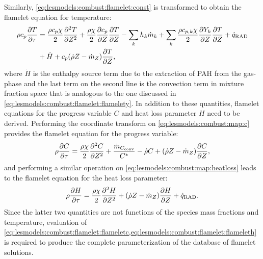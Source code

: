 Similarly, \cref{eq:lesmodels:combust:flamelet:const} is transformed to obtain the flamelet equation for temperature:
\begin{equation}\label{eq:lesmodels:combust:flamelet:flamelett}
  \begin{split}
    \rho c_p \pder[T]{\tau} &= \frac{\rho c_p \chi}{2}\sder[T]{Z} + \frac{\rho\chi}{2}\pder[c_p]{Z}\pder[T]{Z} - \sum\limits_{k} h_k\dot{m}_k + \sum\limits_{k} \frac{\rho c_{p,k}\chi}{2}\pder[Y_k]{Z}\pder[T]{Z} + \dot{q}_{\text{RAD}} \\
    &+ \dot{H} + c_p(\dot{\rho}Z - \dot{m}_Z)\pder[T]{Z},
  \end{split}
\end{equation}
where $\dot{H}$ is the enthalpy source term due to the extraction of PAH from the gas-phase and the last term on the second line is the convection term in mixture fraction space that is analogous to the one discussed in \cref{eq:lesmodels:combust:flamelet:flamelety}. In addition to these quantities, flamelet equations for the progress variable $C$ and heat loss parameter $H$ need to be derived. Performing the coordinate transform on \cref{eq:lesmodels:combust:map:c} provides the flamelet equation for the progress variable:
\begin{equation}\label{eq:lesmodels:combust:flamelet:flameletc}
  \rho\pder[C]{\tau} = \frac{\rho\chi}{2}\sder[C]{Z} + \frac{\dot{m}_{C_{\text{conv}}}}{C^*} - \dot{\rho}C + (\dot{\rho}Z - \dot{m}_Z)\pder[C]{Z},
\end{equation}
and performing a similar operation on \cref{eq:lesmodels:combust:map:heatloss} leads to the flamelet equation for the heat loss parameter:
\begin{equation}\label{eq:lesmodels:combust:flamelet:flameleth}
  \rho\pder[H]{\tau} = \frac{\rho\chi}{2}\sder[H]{Z} + (\dot{\rho}Z - \dot{m}_Z)\pder[H]{Z} + \dot{q}_{\text{RAD}}.
\end{equation}
Since the latter two quantities are not functions of the species mass fractions and temperature, evaluation of \cref{eq:lesmodels:combust:flamelet:flameletc,eq:lesmodels:combust:flamelet:flameleth} is required to produce the complete parameterization of the database of flamelet solutions.

